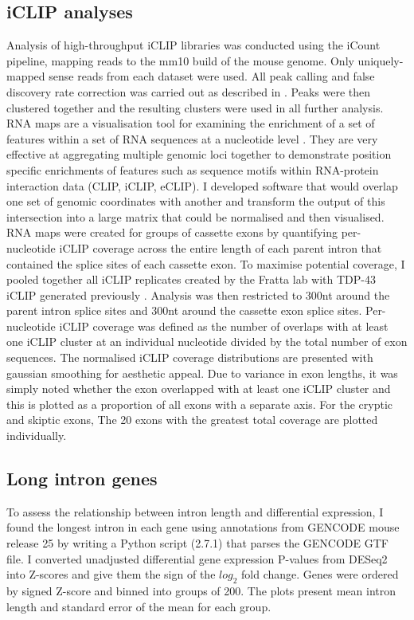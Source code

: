 \subsection{iCLIP analyses}
Analysis  of  high-throughput  iCLIP  libraries  was  conducted  using  the  iCount  pipeline,  mapping  reads  to  the mm10 build of the mouse genome.
Only  uniquely-mapped  sense  reads  from each dataset were used. All peak calling and false discovery rate correction was carried out as described in \citep{Huppertz2014-ip,Konig2010}.  
Peaks were then clustered together and the resulting clusters were used in all further analysis.
RNA maps are a visualisation tool for examining the enrichment of a set of features within a set of RNA sequences at a nucleotide level \citep{Ule2006}. 
They are very effective at aggregating multiple genomic loci together to demonstrate position specific enrichments of features such as sequence motifs within RNA-protein interaction data (CLIP, iCLIP, eCLIP). 
I developed software that would overlap one set of genomic coordinates with another and transform the output of this intersection into a large matrix that could be normalised and then visualised.  
RNA maps were created  for groups of cassette exons by quantifying per-nucleotide iCLIP coverage across the entire length of each parent intron that contained the splice sites of each cassette exon. 
To maximise  potential  coverage,  I pooled together all  iCLIP  replicates created  by the Fratta lab with  TDP-43  iCLIP generated previously \citep{Rogelj2012}. 
Analysis was  then  restricted  to 300nt around  the parent intron splice sites and 300nt around the cassette exon splice sites. 
Per-nucleotide iCLIP coverage was defined as the number of overlaps with at least one iCLIP cluster at an individual nucleotide divided by the total number of exon sequences. 
The normalised iCLIP coverage distributions are presented with gaussian smoothing for aesthetic appeal. 
Due to variance in exon lengths, it was simply noted whether the exon overlapped with at least one iCLIP cluster and this is plotted as a proportion of all exons with a separate axis. 
For the cryptic and skiptic exons, The 20 exons with the greatest total coverage are plotted individually. 

\subsection{Long intron genes}
To assess the relationship between intron length and differential expression, I found the longest intron in each gene using annotations from GENCODE mouse release 25 \citep{Harrow2012} by writing a Python script (2.7.1) that parses the GENCODE GTF file. 
I converted unadjusted differential gene expression P-values from DESeq2 into Z-scores and give them the sign of the $log_2$ fold change. 
Genes were ordered by signed Z-score and binned into groups of  200. 
The plots present mean intron length and  standard error of the mean for each group.  

